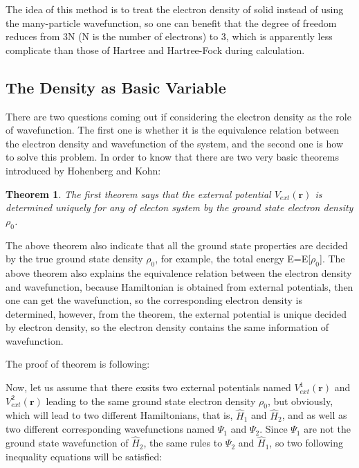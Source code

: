 \documentclass[a4paper, 12pt, titlepage,oneside,drop]{kthesis}
\newtheorem{thm}{Theorem}
\begin{document}
\noindent The idea of this method is to treat the electron density of solid instead of using the many-particle wavefunction, so one can
 benefit that the degree of freedom reduces from 3N (N is the number of electrons) to 3, which is apparently less complicate than 
those of Hartree and Hartree-Fock during calculation. 

\subsection{The Density as Basic Variable}
\noindent There are two questions coming out if considering the electron density as the role of wavefunction. The first one is whether it
 is the equivalence relation between the electron density and wavefunction of the system, and the second one is how to solve this 
problem. In order to know that there are two very basic theorems introduced by Hohenberg and Kohn:

\begin{thm}
\label{hk1}
\noindent The first theorem says that the external potential $V_\textit{ext}(\textbf{r})$  is determined uniquely for any of electon system by the ground state electron density $\rho_0$.
\end{thm}

\noindent The above theorem also indicate that all the ground state properties are decided by the true ground state density $\rho_0$,
for example, the total energy E=E[$\rho_0$]. 
\noindent The above theorem also explains the equivalence relation between the electron density and wavefunction, because Hamiltonian is obtained from external potentials,
then one can get the wavefunction, so the corresponding electron density is determined, however, from the theorem, the external potential is unique decided by electron
density, so the electron density contains the same information of wavefunction.

\noindent The proof of theorem is following:

\noindent Now, let us assume that there exsits two external potentials named $V^{1}_\textit{ext}(\textbf{r})$ and $V^{2}_\textit{ext}(\textbf{r})$ leading to the same ground state 
electron density $\rho_0$, but obviously, which will lead to two different Hamiltonians, that is, $\hat{H}_{1}$ and $\hat{H}_{2}$, and as well as two different corresponding
wavefunctions named $\Psi_1$ and $\Psi_2$. Since $\Psi_1$ are not the ground state wavefunction of $\hat{H}_{2}$, the same rules to $\Psi_2$ and $\hat{H}_{1}$, so two following
inequality equations will be satisfied:
\end{document}
